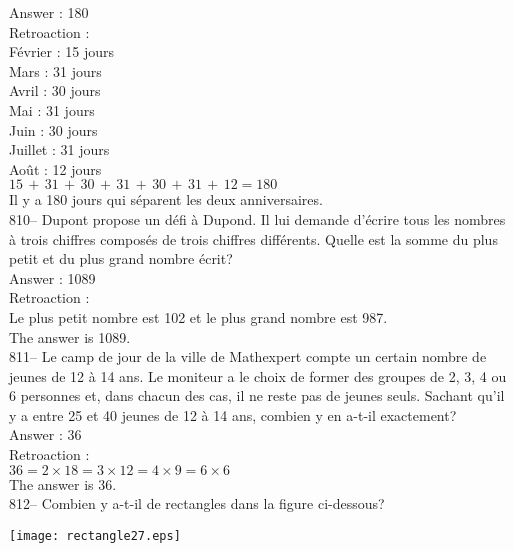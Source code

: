 ﻿\documentclass[letterpaper, 12pt]{article}
\begin{document}
Answer : 180\\

Retroaction : \\
F\'evrier : 15 jours\\
Mars : 31 jours\\
Avril : 30 jours\\
Mai : 31 jours\\
Juin : 30 jours\\
Juillet : 31 jours\\
Ao\^ut : 12 jours\\

$15\,+\,31\,+\,30\,+\,31\,+\,30\,+\,31\,+\,12=180$\\

Il y a 180 jours qui s\'eparent les deux anniversaires.\\

810-- Dupont propose un d\'efi \`a Dupond.  Il lui demande d'\'ecrire tous
les nombres \`a trois chiffres compos\'es de trois chiffres diff\'erents.
Quelle est la somme du plus petit et du plus grand nombre \'ecrit?\\

Answer : 1089\\

Retroaction : \\
Le plus petit nombre est 102 et le plus grand nombre est 987.\\
The answer is 1089.\\

811-- Le camp de jour de la ville de Mathexpert compte un certain nombre de
jeunes de 12 \`a 14 ans.  Le moniteur a le choix de former des groupes de 2,
3, 4 ou 6 personnes et, dans chacun des cas, il ne reste pas de jeunes
seuls.  Sachant qu'il y a entre 25 et 40 jeunes de 12 \`a 14 ans, combien y
en a-t-il exactement?\\

Answer : 36\\

Retroaction : \\
$36=2\times18=3\times12=4\times9=6\times6$\\
The answer is 36.\\

812-- Combien y a-t-il de rectangles dans la figure ci-dessous?\\
    \begin{center}
    \texttt{[image: rectangle27.eps]}
    \end{center}
\end{document}
